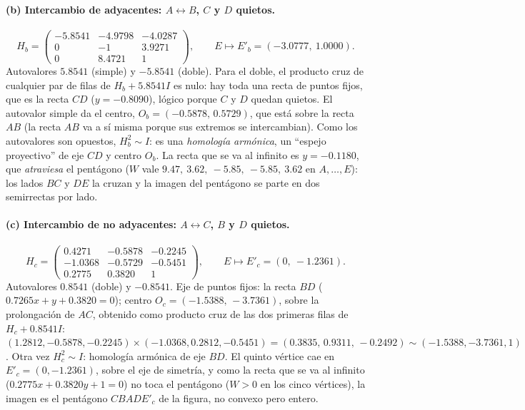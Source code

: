 \paragraph{(b) Intercambio de adyacentes: \(A\leftrightarrow B\), \(C\) y \(D\) quietos.}
\[
  H_b=\begin{pmatrix}-5.8541&-4.9798&-4.0287\\0&-1&3.9271\\0&8.4721&1\end{pmatrix},
  \qquad E\mapsto E'_b=(-3.0777,\ 1.0000).
\]
Autovalores \(5.8541\) (simple) y \(-5.8541\) (doble). Para el doble, el producto cruz de
cualquier par de filas de \(H_b+5.8541I\) es nulo: hay toda una recta de puntos fijos, que es
la recta \(CD\) (\(y=-0.8090\)), lógico porque \(C\) y \(D\) quedan quietos. El autovalor
simple da el centro, \(O_b=(-0.5878,\,0.5729)\), que está sobre la recta \(AB\) (la recta
\(AB\) va a sí misma porque sus extremos se intercambian). Como los autovalores son
opuestos, \(H_b^2\sim I\): es una \emph{homología armónica}, un ``espejo proyectivo'' de eje
\(CD\) y centro \(O_b\). La recta que se va al infinito es \(y=-0.1180\), que
\emph{atraviesa} el pentágono (\(W\) vale \(9.47,\ 3.62,\ -5.85,\ -5.85,\ 3.62\) en
\(A,\dots,E\)): los lados \(BC\) y \(DE\) la cruzan y la imagen del pentágono se parte en
dos semirrectas por lado.

\paragraph{(c) Intercambio de no adyacentes: \(A\leftrightarrow C\), \(B\) y \(D\) quietos.}
\[
  H_c=\begin{pmatrix}0.4271&-0.5878&-0.2245\\-1.0368&-0.5729&-0.5451\\0.2775&0.3820&1\end{pmatrix},
  \qquad E\mapsto E'_c=(0,\ -1.2361).
\]
Autovalores \(0.8541\) (doble) y \(-0.8541\). Eje de puntos fijos: la recta \(BD\)
(\(0.7265x+y+0.3820=0\)); centro \(O_c=(-1.5388,\,-3.7361)\), sobre la prolongación de
\(AC\), obtenido como producto cruz de las dos primeras filas de \(H_c+0.8541I\):
\((1.2812,-0.5878,-0.2245)\times(-1.0368,0.2812,-0.5451)=(0.3835,\,0.9311,\,-0.2492)\sim
(-1.5388,-3.7361,1)\). Otra vez \(H_c^2\sim I\): homología armónica de eje \(BD\). El
quinto vértice cae en \(E'_c=(0,-1.2361)\), sobre el eje de simetría, y como la recta que se
va al infinito (\(0.2775x+0.3820y+1=0\)) no toca el pentágono (\(W>0\) en los cinco
vértices), la imagen es el pentágono \(CBADE'_c\) de la figura, no convexo pero entero.

